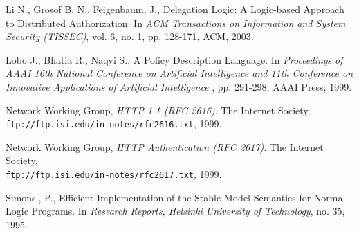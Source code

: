 \documentclass[11pt, twocolumn]{article}
\begin{document}
\begin{thebibliography}{5}
      Li N., Grosof B. N., Feigenbaum, J.,
      Delegation Logic: A Logic-based Approach to Distributed Authorization.
      In {\em ACM Transactions on Information and System Security (TISSEC)},
      vol. 6, no. 1, pp. 128-171, ACM, 2003.

      Lobo J., Bhatia R., Naqvi S.,
      A Policy Description Language.
      In {\em Proceedings of AAAI 16th National Conference on Artificial
      Intelligence and 11th Conference on Innovative Applications of Artificial
      Intelligence }, pp. 291-298, AAAI Press, 1999.

      Network Working Group,
      {\em HTTP 1.1 (RFC 2616)}.
      The Internet Society, \\
      {\scriptsize \tt ftp://ftp.isi.edu/in-notes/rfc2616.txt},
      1999.

      Network Working Group,
      {\em HTTP Authentication (RFC 2617)}.
      The Internet Society, \\
      {\scriptsize \tt ftp://ftp.isi.edu/in-notes/rfc2617.txt},
      1999.

      Simons., P.,
      Efficient Implementation of the Stable Model Semantics for Normal Logic
      Programs.
      In {\em Research Reports, Helsinki University of Technology},
      no. 35, 1995.
  \end{thebibliography}
\end{document}

